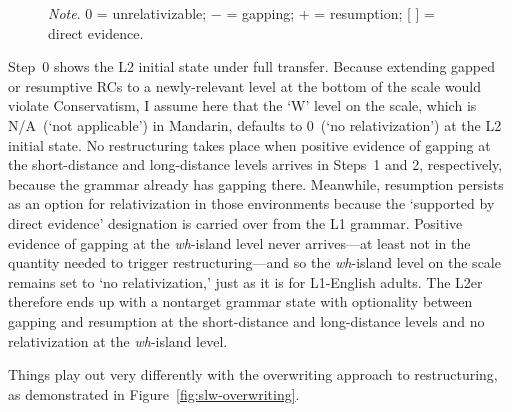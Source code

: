 \begin{figure}
\begin{mybox}
\vspace{-6pt} 
\end{mybox}
\vspace{-6pt} 
\textit{Note}. 0 = unrelativizable; − = gapping; + = resumption; [ ] = direct evidence.\par
{}\vspace{-12pt}
\end{figure}

\noindent Step~0 shows the L2 initial state under full transfer. Because extending gapped or resumptive RCs to a newly-relevant level at the bottom of the scale would violate Conservatism, I assume here that the `W' level on the scale, which is N/A~(`not applicable') in Mandarin, defaults to 0~(`no relativization') at the L2 initial state. No restructuring takes place when positive evidence of gapping at the short-distance and long-distance levels arrives in Steps~1 and 2, respectively, because the grammar already has gapping there. Meanwhile, resumption persists as an option for relativization in those environments because the `supported by direct evidence' designation is carried over from the L1 grammar. Positive evidence of gapping at the \textit{wh}-island level never arrives—at least not in the quantity needed to trigger restructuring---and so the \textit{wh}-island level on the scale remains set to `no relativization,' just as it is for L1-English adults. The L2er therefore ends up with a nontarget grammar state with optionality between gapping and resumption at the short-distance and long-distance levels and no relativization at the \textit{wh}-island level.

Things play out very differently with the overwriting approach to restructuring, as demonstrated in Figure~\ref{fig:slw-overwriting}. 

